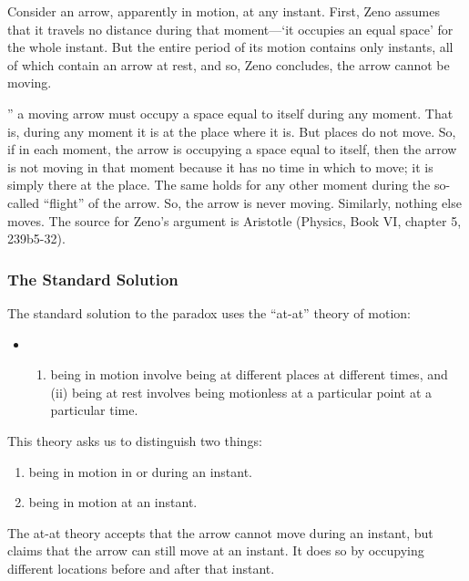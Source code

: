 \documentclass[]{article}
\begin{document}
Consider an arrow, apparently in motion, at any instant. First, Zeno
assumes that it travels no distance during that moment---`it occupies an
equal space' for the whole instant. But the entire period of its motion
contains only instants, all of which contain an arrow at rest, and so,
Zeno concludes, the arrow cannot be moving.

'' a moving arrow must occupy a space equal to itself during any moment.
That is, during any moment it is at the place where it is. But places do
not move. So, if in each moment, the arrow is occupying a space equal to
itself, then the arrow is not moving in that moment because it has no
time in which to move; it is simply there at the place. The same holds
for any other moment during the so-called ``flight'' of the arrow. So,
the arrow is never moving. Similarly, nothing else moves. The source for
Zeno's argument is Aristotle (Physics, Book VI, chapter 5, 239b5-32).

\subsubsection{The Standard Solution}\label{the-standard-solution}

The standard solution to the paradox uses the ``at-at'' theory of
motion:

\begin{itemize}
\item
  \begin{enumerate}
  \def\labelenumi{(\roman{enumi})}
  \itemsep1pt\parskip0pt
  \item
    being in motion involve being at different places at different
    times, and (ii) being at rest involves being motionless at a
    particular point at a particular time.
  \end{enumerate}
\end{itemize}

This theory asks us to distinguish two things:

\begin{enumerate}
\def\labelenumi{\alph{enumi})}
\itemsep1pt\parskip0pt
\item
  being in motion in or during an instant.
\item
  being in motion at an instant.
\end{enumerate}

The at-at theory accepts that the arrow cannot move during an instant,
but claims that the arrow can still move at an instant. It does so by
occupying different locations before and after that instant.
\end{document}
